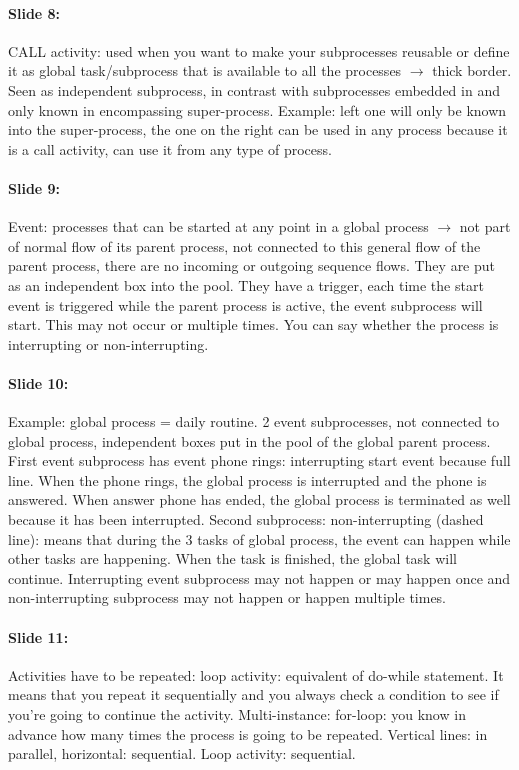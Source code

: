\documentclass[10pt,a4paper]{report}
\begin{document}
\paragraph{Slide 8:}CALL activity: used when you want to make your subprocesses reusable or define it as global task/subprocess that is available to all the processes $\rightarrow$ thick border. Seen as independent subprocess, in contrast with subprocesses embedded in and only known in encompassing super-process. Example: left one will only be known into the super-process, the one on the right can be used in any process because it is a call activity, can use it from any type of process.

\paragraph{Slide 9:}Event: processes that can be started at any point in a global process $\rightarrow$ not part of normal flow of its parent process, not connected to this general flow of the parent process, there are no incoming or outgoing sequence flows. They are put as an independent box into the pool. They have a trigger, each time the start event is triggered while the parent process is active, the event subprocess will start. This may not occur or multiple times. You can say whether the process is interrupting or non-interrupting.

\paragraph{Slide 10:}Example: global process = daily routine. 2 event subprocesses, not connected to global process, independent boxes put in the pool of the global parent process. First event subprocess has event phone rings: interrupting start event because full line. When the phone rings, the global process is interrupted and the phone is answered. When answer phone has ended, the global process is terminated as well because it has been interrupted. Second subprocess: non-interrupting (dashed line): means that during the 3 tasks of global process, the event can happen while other tasks are happening. When the task is finished, the global task will continue. Interrupting event subprocess may not happen or may happen once and non-interrupting subprocess may not happen or happen multiple times.

\paragraph{Slide 11:}Activities have to be repeated: loop activity: equivalent of do-while statement. It means that you repeat it sequentially and you always check a condition to see if you're going to continue the activity. Multi-instance: for-loop: you know in advance how many times the process is going to be repeated. Vertical lines: in parallel, horizontal: sequential.  Loop activity: sequential.
\end{document}
